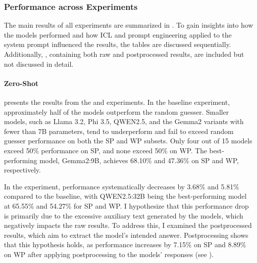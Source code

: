 \subsubsection{Performance across Experiments}
\label{sec:performance-across-experiments}

The main results of all experiments are summarized in . To gain insights into how the models performed and how \acf{ICL} and prompt engineering applied to the system prompt influenced the results, the tables are discussed sequentially. Additionally, , containing both raw and postprocessed results, are included but not discussed in detail.

\paragraph{Zero-Shot}
\label{par:zero-shot}

 presents the results from the  and  experiments. In the baseline experiment, approximately half of the models outperform the random guesser. Smaller models, such as Llama 3.2, Phi 3.5, QWEN2.5, and the Gemma2 variants with fewer than 7B parameters, tend to underperform and fail to exceed random guesser performance on both the \ac{SP} and \ac{WP} subsets. Only four out of 15 models exceed 50\% performance on \ac{SP}, and none exceed 50\% on \ac{WP}. The best-performing model, Gemma2:9B, achieves 68.10\% and 47.36\% on \ac{SP} and \ac{WP}, respectively.

In the  experiment, performance systematically decreases by 3.68\% and 5.81\% compared to the baseline, with QWEN2.5:32B being the best-performing model at 65.55\% and 54.27\% for \ac{SP} and \ac{WP}. I hypothesize that this performance drop is primarily due to the excessive auxiliary text generated by the models, which negatively impacts the raw results. To address this, I examined the postprocessed results, which aim to extract the model's intended answer. Postprocessing shows that this hypothesis holds, as performance increases by 7.15\% on \ac{SP} and 8.89\% on \ac{WP} after applying postprocessing to the models' responses (see ).

